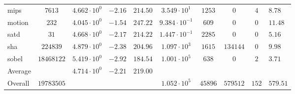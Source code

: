 \begin{tabular}{|l|c|HHc|c|c|c|cH|}
mips          & $ 7613     $ & $ 4.662 \cdot 10^{0} $ & $ -2.16 $ & $ 214.50 $ & $ 3.549 \cdot 10^{1}  $ & $ 1253  $ & $ 0      $ & $ 4   $ & $ 8.78    $ \\
motion        & $ 232      $ & $ 4.045 \cdot 10^{0} $ & $ -1.54 $ & $ 247.22 $ & $ 9.384 \cdot 10^{-1} $ & $ 609   $ & $ 0      $ & $ 0   $ & $ 11.48   $ \\
satd          & $ 31       $ & $ 4.668 \cdot 10^{0} $ & $ -2.17 $ & $ 214.22 $ & $ 1.447 \cdot 10^{-1} $ & $ 2285  $ & $ 0      $ & $ 0   $ & $ 5.16    $ \\
sha           & $ 224839   $ & $ 4.879 \cdot 10^{0} $ & $ -2.38 $ & $ 204.96 $ & $ 1.097 \cdot 10^{3}  $ & $ 1615  $ & $ 134144 $ & $ 0   $ & $ 9.98    $ \\
sobel         & $ 18468122 $ & $ 5.419 \cdot 10^{0} $ & $ -2.92 $ & $ 184.54 $ & $ 1.001 \cdot 10^{5}  $ & $ 638   $ & $ 0      $ & $ 2   $ & $ 3.71    $ \\
\hline
Average       & $          $ & $ 4.714 \cdot 10^{0} $ & $ -2.21 $ & $ 219.00 $ & $                     $ & $       $ & $        $ & $     $ & $         $ \\
\hline
Overall       & $ 19783505 $ & $                    $ & $       $ & $        $ & $ 1.052 \cdot 10^{5}  $ & $ 45896 $ & $ 579512 $ & $ 152 $ & $ 579.51  $ \\
\hline
\end{tabular}
